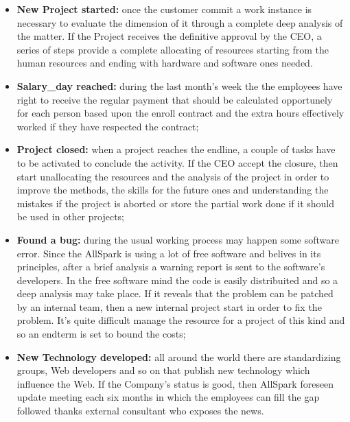 \begin{itemize}
  \item {\bf New Project started:} once the customer commit a work instance is necessary to evaluate the dimension of it through a complete deep analysis of the matter. If the Project receives the definitive approval by the CEO, a series of steps provide a complete allocating of resources starting from the human resources and ending with hardware and software ones needed.
  \item {\bf Salary\_day reached:} during the last month's week the the employees have right to receive the regular payment that should be calculated opportunely for each person based upon the enroll contract and the extra hours effectively worked if they have respected the contract;
  \item {\bf Project closed:} when a project reaches the endline, a couple of tasks have to be activated to conclude the activity. If the CEO accept the closure, then start unallocating the resources and the analysis of the project in order to improve the methods, the skills for the future ones and understanding the mistakes if the project is aborted or store the partial work done if it should be used in other projects;
  \item {\bf Found a bug:} during the usual working process may happen some software error. Since the AllSpark is using a lot of free software and belives in its principles, after a brief analysis a warning report is sent to the software's developers. In the free software mind the code is easily distribuited and so a deep analysis may take place. If it reveals that the problem can be patched by an internal team, then a new internal project start in order to fix the problem. It's quite difficult manage the resource for a project of this kind and so an endterm is set to bound the costs;
  \item {\bf New Technology developed:} all around the world there are standardizing groups, Web developers and so on that publish new technology which influence the Web. If the Company's status is good, then AllSpark foreseen update meeting each six months in which the employees can fill the gap followed thanks external consultant who exposes the news.
\end{itemize}

